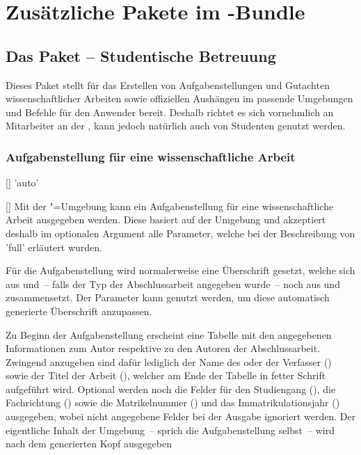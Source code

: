 \chapter{Zusätzliche Pakete im \TUDScript-Bundle}
\label{sec:bundle}
\section{Das Paket  -- Studentische Betreuung}
\begin{Declaration*}{}
Dieses Paket stellt für das Erstellen von Aufgabenstellungen und Gutachten  
wissenschaftlicher Arbeiten sowie offiziellen Aushängen im \CD passende 
Umgebungen und Befehle für den Anwender bereit. Deshalb richtet es sich 
vornehmlich an Mitarbeiter an der \TnUD, kann jedoch natürlich auch von 
Studenten genutzt werden.


\subsection{Aufgabenstellung für eine wissenschaftliche Arbeit}
\begin{Declaration}{[]}{%
  'auto'%
}
\begin{Declaration}{[]}
\printdeclarationlist%
%
%
Mit der "=Umgebung kann ein Aufgabenstellung für eine 
wissenschaftliche Arbeit ausgegeben werden. Diese basiert auf der Umgebung 
 und akzeptiert deshalb im optionalen Argument alle 
Parameter, welche bei der Beschreibung von 'full' 
erläutert wurden.

Für die Aufgabenstellung wird normalerweise eine Überschrift gesetzt, welche 
sich aus  und~-- falls der Typ der Abschlussarbeit angegeben 
wurde~-- noch aus  und  zusammensetzt. Der 
Parameter  kann genutzt werden, um diese 
automatisch generierte Überschrift anzupassen.

Zu Beginn der Aufgabenstellung erscheint eine Tabelle mit den angegebenen 
Informationen zum Autor respektive zu den Autoren der Abschlussarbeit. Zwingend 
anzugeben sind dafür lediglich der Name des oder der Verfasser () 
sowie der Titel der Arbeit (), welcher am Ende der Tabelle in 
fetter Schrift aufgeführt wird. Optional werden noch die Felder für den 
Studiengang (), die Fachrichtung () sowie die 
Matrikelnummer () und das Immatrikulationsjahr 
() ausgegeben, wobei nicht angegebene Felder bei der 
Ausgabe ignoriert werden. Der eigentliche Inhalt der Umgebung~-- sprich die 
Aufgabenstellung selbst~-- wird nach dem generierten Kopf ausgegeben


\end{Declaration}
\end{Declaration}
\end{Declaration*}
